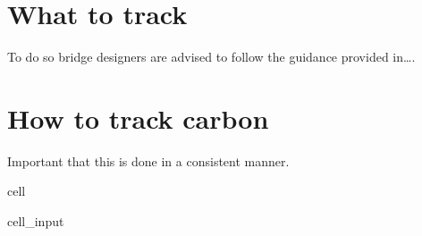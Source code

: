 \documentclass[letterpaper,10pt,english]{jupyterBook}
\begin{document}
\section{What to track}
\label{\detokenize{part1/keeping_track:what-to-track}}
\sphinxAtStartPar
To do so bridge designers are advised to follow the guidance provided in….


\section{How to track carbon}
\label{\detokenize{part1/keeping_track:how-to-track-carbon}}
\sphinxAtStartPar
Important that this is done in a consistent manner.

\begin{sphinxuseclass}{cell}\begin{sphinxVerbatimInput}

\begin{sphinxuseclass}{cell_input}
\begin{sphinxVerbatim}[commandchars=\\\{\}]
   
   


\end{sphinxVerbatim}
\end{sphinxuseclass}
\end{sphinxVerbatimInput}
\end{sphinxuseclass}
\end{document}
